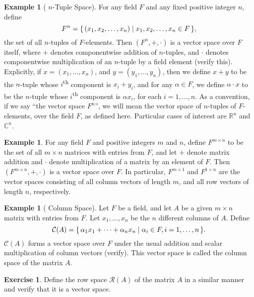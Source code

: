 \documentclass[svgnames]{article}
\theoremstyle{definition}
\newtheorem{Example}[Theorem]{Example}
\newtheorem{Exercise}{Exercise}[section]
\theoremstyle{remark}
\newcommand{\newterm}[1]{{\color{alertcolor} #1}}
\renewcommand{\th}{\textsuperscript{th}\xspace}
\begin{document}
\begin{Example}[\newterm{$n$-Tuple Space}]\label{ex:nTupleSpace}
For any field $F$ and any fixed positive integer $n$, define
\begin{equation*}
F^n = \qty{\, (x_1, x_2, \ldots, x_n) \mid x_1, x_2, \ldots, x_n \in F \,},
\end{equation*}
the set of all $n$-tuples of $F$-elements. Then $(F^n, +, \cdot)$ is a vector space over $F$ itself, where $+$ denotes componentwise addition of $n$-tuples, and $\cdot$ denotes componentwise multiplication of an $n$-tuple by a field element (verify this). Explicitly, if $x = (x_1, \ldots, x_n)$, and $y = (y_1, \ldots, y_n)$, then we define $x + y$ to be the $n$-tuple whose $i$\th component is $x_i + y_i$, and for any $\alpha \in F$, we define $\alpha \cdot x$ to be the $n$-tuple whose $i$\th component is $\alpha x_i$, for each $i = 1, \ldots, n$. As a convention, if we say ``the vector space $F^n$'', we will mean the vector space of $n$-tuples of $F$-elements, over the field $F$, as defined here. Particular cases of interest are $\mathbb R^n$ and $\mathbb C^n$.
\end{Example}

\begin{Example}\label{ex:MatSpace}
For any field $F$ and positive integers $m$ and $n$, define $F^{m \times n}$ to be the set of all $m \times n$ matrices with entries from $F$, and let $+$ denote matrix addition and $\cdot$ denote multiplication of a matrix by an element of $F$. Then $(F^{m \times n}, +, \cdot)$ is a vector space over $F$. In particular, $F^{m \times 1}$ and $F^{1 \times n}$ are the vector spaces consisting of all column vectors of length $m$, and all row vectors of length $n$, respectively.
\end{Example}

\begin{Example}[\newterm{Column Space}]\label{ex:ColSpace}
Let $F$ be a field, and let $A$ be a given $m \times n$ matrix with entries from $F$. Let $x_1, \ldots, x_n$ be the $n$ different columns of $A$. Define
\begin{equation*}
	\mathcal C(A) = \qty{\, \alpha_1 x_1 + \cdots + \alpha_n x_n \mid \alpha_i \in F, i = 1, \ldots, n \,}.
\end{equation*}
$\mathcal C(A)$ forms a vector space over $F$ under the usual addition and scalar multiplication of column vectors (verify). This vector space is called the \newterm{column space} of the matrix $A$.
\end{Example}
\begin{Exercise}\label{exer:RowSpace}
Define the \newterm{row space} $\mathcal R(A)$ of the matrix $A$ in a similar manner and verify that it is a vector space.
\end{Exercise}
\end{document}
